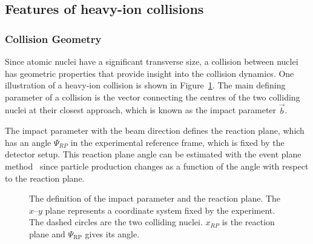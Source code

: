 \pagebreak
\FloatBarrier
\subsection{Features of heavy-ion collisions}
\label{sec:features}
\subsubsection{Collision Geometry}
\label{sec:geometry}
Since atomic nuclei have a significant transverse size, a collision between nuclei has geometric properties that provide insight into the collision dynamics.  One illustration of a heavy-ion collision is shown in Figure~\ref{fig:planes}. The main defining parameter of a collision is the vector connecting the centres of the two colliding nuclei at their closest approach, which is known as the impact parameter $\vec b$.

The impact parameter with the beam direction defines the reaction plane, which has an angle $\Psi_{RP}$ in the experimental reference frame, which is fixed by the detector setup. This reaction plane angle can be estimated with the event plane method~\cite{Voloshin:2008dg} since particle production changes as a function of the angle with respect to the reaction plane. 
\begin{figure}[h!]
\centering
%      

\caption[The definitions of the Reaction Plane coordinate systems]{The definition of the impact parameter and the reaction plane. The $x$--$y$ plane represents a coordinate system fixed by the experiment. The dashed circles are the two colliding nuclei. $x_{RP}$ is the reaction plane and $\Psi_\mathrm{RP}$ gives its angle.} %
\label{fig:planes}
\end{figure}

